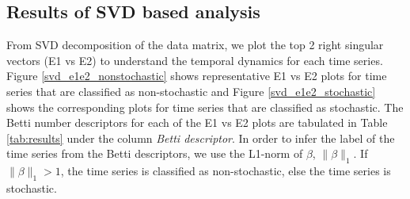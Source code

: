 \documentclass[journal]{IEEEtran}
\begin{document}
\subsection{Results of SVD based analysis}



From SVD decomposition of the data matrix, we plot the top 2 right singular vectors (E1 vs E2) to understand the temporal dynamics for each time series. Figure \ref{svd_e1e2_nonstochastic} shows representative E1 vs E2 plots for time series  that are classified as non-stochastic and Figure \ref{svd_e1e2_stochastic}  shows the corresponding plots for time series that are classified as stochastic. The Betti number descriptors for each of the E1 vs E2 plots are tabulated in Table \ref{tab:results} under the column \textit{Betti descriptor}. In order to infer the label of the time series from the Betti descriptors, we use the L1-norm of $\beta$, $\|\beta\|_1$. If $\|\beta\|_1 > 1$, the time series is classified as non-stochastic, else the time series is stochastic.


\end{document}
